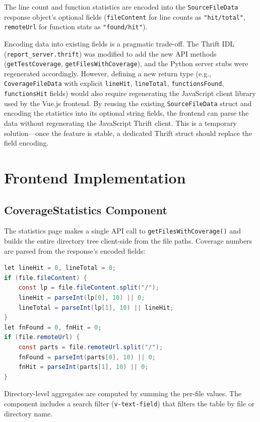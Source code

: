 The line count and function statistics are encoded into the \texttt{SourceFileData} response object's optional fields (\texttt{fileContent} for line counts as \texttt{"hit/total"}, \texttt{remoteUrl} for function stats as \texttt{"found/hit"}).

Encoding data into existing fields is a pragmatic trade-off. The Thrift IDL (\texttt{report\_server.thrift}) was modified to add the new API methods (\texttt{getTestCoverage}, \texttt{getFilesWithCoverage}), and the Python server stubs were regenerated accordingly. However, defining a new return type (e.g., \texttt{CoverageFileData} with explicit \texttt{lineHit}, \texttt{lineTotal}, \texttt{functionsFound}, \texttt{functionsHit} fields) would also require regenerating the JavaScript client library used by the Vue.js frontend. By reusing the existing \texttt{SourceFileData} struct and encoding the statistics into its optional string fields, the frontend can parse the data without regenerating the JavaScript Thrift client. This is a temporary solution---once the feature is stable, a dedicated Thrift struct should replace the field encoding.

\section{Frontend Implementation}

\subsection{CoverageStatistics Component}

The statistics page makes a single API call to \texttt{getFilesWithCoverage()} and builds the entire directory tree client-side from the file paths. Coverage numbers are parsed from the response's encoded fields:

\begin{lstlisting}[language=Java, caption={Parsing coverage data from API response}]
let lineHit = 0, lineTotal = 0;
if (file.fileContent) {
    const lp = file.fileContent.split("/");
    lineHit = parseInt(lp[0], 10) || 0;
    lineTotal = parseInt(lp[1], 10) || lineHit;
}
let fnFound = 0, fnHit = 0;
if (file.remoteUrl) {
    const parts = file.remoteUrl.split("/");
    fnFound = parseInt(parts[0], 10) || 0;
    fnHit = parseInt(parts[1], 10) || 0;
}
\end{lstlisting}

Directory-level aggregates are computed by summing the per-file values. The component includes a search filter (\texttt{v-text-field}) that filters the table by file or directory name.

